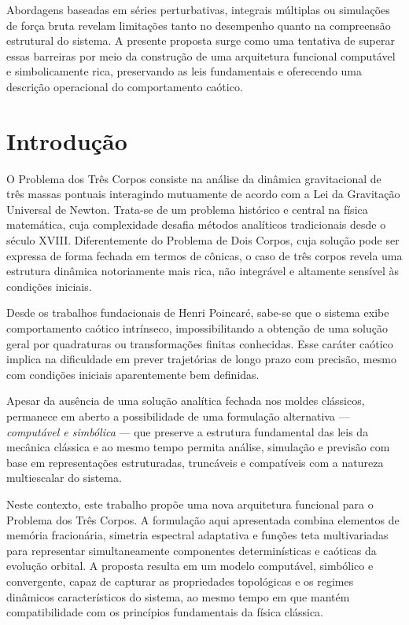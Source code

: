 \documentclass[12pt]{article}
\begin{document}
Abordagens baseadas em séries perturbativas, integrais múltiplas ou simulações de força bruta revelam limitações tanto no desempenho quanto na compreensão estrutural do sistema. A presente proposta surge como uma tentativa de superar essas barreiras por meio da construção de uma arquitetura funcional computável e simbolicamente rica, preservando as leis fundamentais e oferecendo uma descrição operacional do comportamento caótico.


\section{Introdução}

O Problema dos Três Corpos consiste na análise da dinâmica gravitacional de três massas pontuais interagindo mutuamente de acordo com a Lei da Gravitação Universal de Newton. Trata-se de um problema histórico e central na física matemática, cuja complexidade desafia métodos analíticos tradicionais desde o século XVIII. Diferentemente do Problema de Dois Corpos, cuja solução pode ser expressa de forma fechada em termos de cônicas, o caso de três corpos revela uma estrutura dinâmica notoriamente mais rica, não integrável e altamente sensível às condições iniciais.

Desde os trabalhos fundacionais de Henri Poincaré, sabe-se que o sistema exibe comportamento caótico intrínseco, impossibilitando a obtenção de uma solução geral por quadraturas ou transformações finitas conhecidas. Esse caráter caótico implica na dificuldade em prever trajetórias de longo prazo com precisão, mesmo com condições iniciais aparentemente bem definidas.

Apesar da ausência de uma solução analítica fechada nos moldes clássicos, permanece em aberto a possibilidade de uma formulação alternativa — \textit{computável e simbólica} — que preserve a estrutura fundamental das leis da mecânica clássica e ao mesmo tempo permita análise, simulação e previsão com base em representações estruturadas, truncáveis e compatíveis com a natureza multiescalar do sistema.

Neste contexto, este trabalho propõe uma nova arquitetura funcional para o Problema dos Três Corpos. A formulação aqui apresentada combina elementos de memória fracionária, simetria espectral adaptativa e funções teta multivariadas para representar simultaneamente componentes determinísticas e caóticas da evolução orbital. A proposta resulta em um modelo computável, simbólico e convergente, capaz de capturar as propriedades topológicas e os regimes dinâmicos característicos do sistema, ao mesmo tempo em que mantém compatibilidade com os princípios fundamentais da física clássica.
\end{document}
